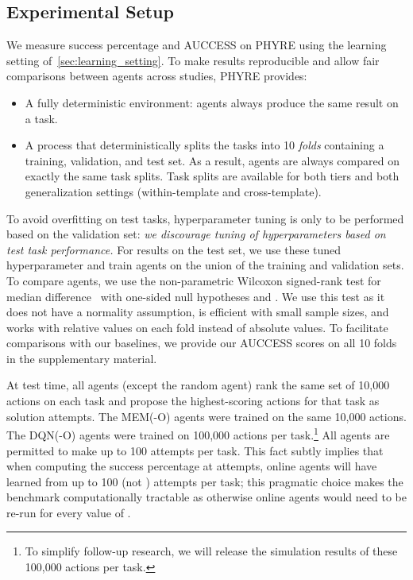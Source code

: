 \documentclass{article}
\begin{document}
\subsection{Experimental Setup}\label{sec:exp_setup}
We measure success percentage and AUCCESS on PHYRE using the learning setting of~\ref{sec:learning_setting}.
To make results reproducible and allow fair comparisons between agents across studies, PHYRE provides:
\begin{itemize}[leftmargin=*]
\setlength\itemsep{0em}
\item A fully deterministic environment: agents always produce the same result on a task.
\item A process that deterministically splits the tasks into 10 \emph{folds} containing a training, validation, and test set. As a result, agents are always compared on exactly the same task splits. Task splits are available for both tiers and both generalization settings (within-template and cross-template).
\end{itemize}
To avoid overfitting on test tasks, hyperparameter tuning is only to be performed based on the validation set: \emph{we discourage tuning of hyperparameters based on test task performance.} For results on the test set, we use these tuned hyperparameter and train agents on the union of the training and validation sets. To compare agents, we use the non-parametric Wilcoxon signed-rank test for median difference~\cite{wilcoxon1945individual} with one-sided null hypotheses and .
We use this test as it does not have a normality assumption, is efficient with small sample sizes, and works with relative values on each fold instead of absolute values.
To facilitate comparisons with our baselines, we provide our AUCCESS scores on all 10 folds in the supplementary material.

At test time, all agents (except the random agent) rank the same set of 10,000 actions on each task and propose the highest-scoring actions for that task as solution attempts. The MEM(-O) agents were trained on the same 10,000 actions. The DQN(-O) agents were trained on 100,000 actions per task.\footnote{To simplify follow-up research, we will release the simulation results of these 100,000 actions per task.} All agents are permitted to make up to 100 attempts per task. This fact subtly implies that when computing the success percentage at  attempts, online agents will have learned from up to 100 (not ) attempts per task; this pragmatic choice makes the benchmark computationally tractable as otherwise online agents would need to be re-run for every value of .
\end{document}
